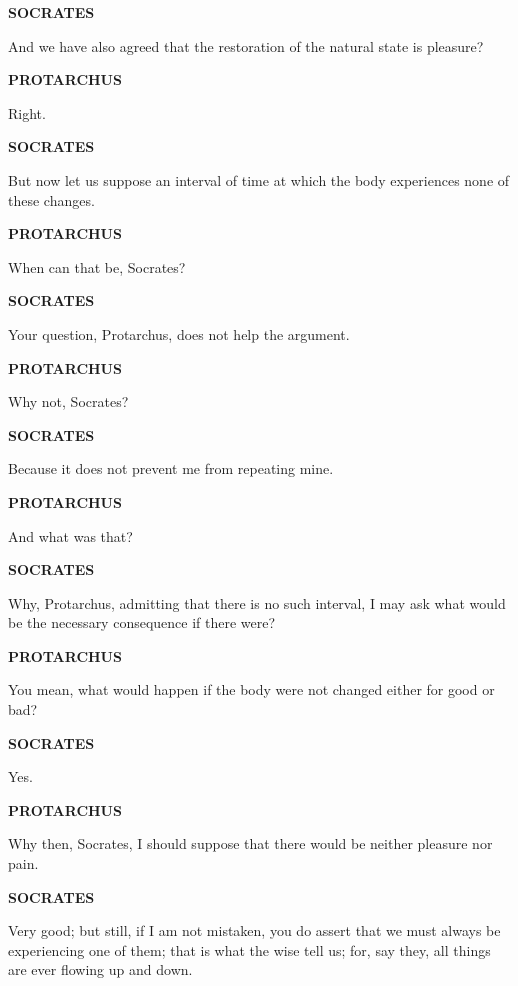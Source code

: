 \documentclass[11pt,letter]{article}
\begin{document}
\par \textbf{SOCRATES}
\par   And we have also agreed that the restoration of the natural state is pleasure?

\par \textbf{PROTARCHUS}
\par   Right.

\par \textbf{SOCRATES}
\par   But now let us suppose an interval of time at which the body experiences none of these changes.

\par \textbf{PROTARCHUS}
\par   When can that be, Socrates?

\par \textbf{SOCRATES}
\par   Your question, Protarchus, does not help the argument.

\par \textbf{PROTARCHUS}
\par   Why not, Socrates?

\par \textbf{SOCRATES}
\par   Because it does not prevent me from repeating mine.

\par \textbf{PROTARCHUS}
\par   And what was that?

\par \textbf{SOCRATES}
\par   Why, Protarchus, admitting that there is no such interval, I may ask what would be the necessary consequence if there were?

\par \textbf{PROTARCHUS}
\par   You mean, what would happen if the body were not changed either for good or bad?

\par \textbf{SOCRATES}
\par   Yes.

\par \textbf{PROTARCHUS}
\par   Why then, Socrates, I should suppose that there would be neither pleasure nor pain.

\par \textbf{SOCRATES}
\par   Very good; but still, if I am not mistaken, you do assert that we must always be experiencing one of them; that is what the wise tell us; for, say they, all things are ever flowing up and down.
\end{document}
